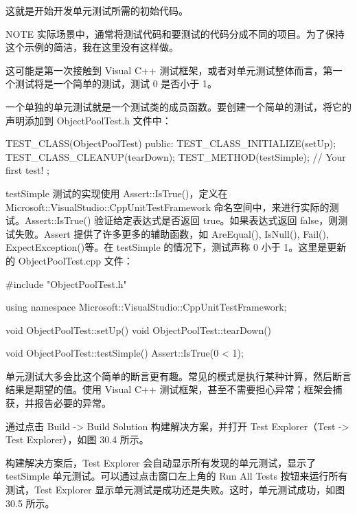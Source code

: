 这就是开始开发单元测试所需的初始代码。

\begin{myNotic}{NOTE}
实际场景中，通常将测试代码和要测试的代码分成不同的项目。为了保持这个示例的简洁，我在这里没有这样做。
\end{myNotic}


这可能是第一次接触到 Visual C++ 测试框架，或者对单元测试整体而言，第一个测试将是一个简单的测试，测试 0 是否小于 1。

一个单独的单元测试就是一个测试类的成员函数。要创建一个简单的测试，将它的声明添加到 ObjectPoolTest.h 文件中：

\begin{cpp}
TEST_CLASS(ObjectPoolTest)
{
    public:
        TEST_CLASS_INITIALIZE(setUp);
        TEST_CLASS_CLEANUP(tearDown);
        TEST_METHOD(testSimple); // Your first test!
};
\end{cpp}

testSimple 测试的实现使用 Assert::IsTrue()，定义在 Microsoft::VisualStudio::CppUnitTestFramework 命名空间中，来进行实际的测试。Assert::IsTrue() 验证给定表达式是否返回 true。如果表达式返回 false，则测试失败。Assert 提供了许多更多的辅助函数，如 AreEqual(), IsNull(), Fail(), ExpectException()等。在 testSimple 的情况下，测试声称 0 小于 1。这里是更新的 ObjectPoolTest.cpp 文件：

\begin{cpp}
#include "ObjectPoolTest.h"

using namespace Microsoft::VisualStudio::CppUnitTestFramework;

void ObjectPoolTest::setUp() { }
void ObjectPoolTest::tearDown() { }

void ObjectPoolTest::testSimple()
{
    Assert::IsTrue(0 < 1);
}
\end{cpp}

单元测试大多会比这个简单的断言更有趣。常见的模式是执行某种计算，然后断言结果是期望的值。使用 Visual C++ 测试框架，甚至不需要担心异常；框架会捕获，并报告必要的异常。


通过点击 Build -> Build Solution 构建解决方案，并打开 Test Explorer（Test -> Test Explorer），如图 30.4 所示。


构建解决方案后，Test Explorer 会自动显示所有发现的单元测试，显示了 testSimple 单元测试。可以通过点击窗口左上角的 Run All Tests 按钮来运行所有测试，Test Explorer 显示单元测试是成功还是失败。这时，单元测试成功，如图 30.5 所示。

